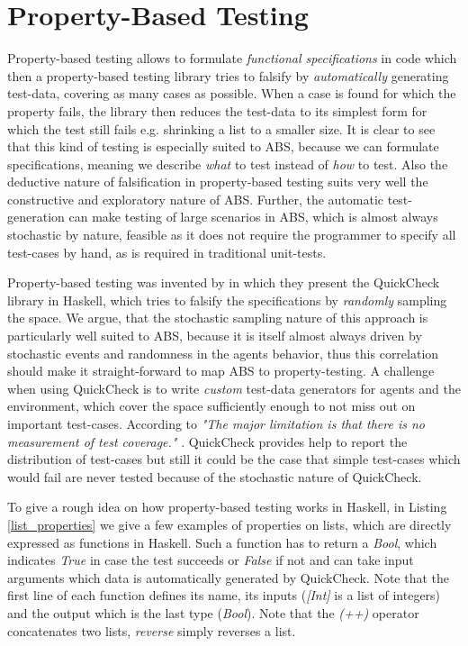 \section{Property-Based Testing}
\label{sec:proptesting}

Property-based testing allows to formulate \textit{functional specifications} in code which then a property-based testing library tries to falsify by \textit{automatically} generating test-data, covering as many cases as possible. When a case is found for which the property fails, the library then reduces the test-data to its simplest form for which the test still fails e.g. shrinking a list to a smaller size. It is clear to see that this kind of testing is especially suited to ABS, because we can formulate specifications, meaning we describe \textit{what} to test instead of \textit{how} to test. Also the deductive nature of falsification in property-based testing suits very well the constructive and exploratory nature of ABS. Further, the automatic test-generation can make testing of large scenarios in ABS, which is almost always stochastic by nature, feasible as it does not require the programmer to specify all test-cases by hand, as is required in traditional unit-tests.

Property-based testing was invented by  in which they present the QuickCheck library in Haskell, which tries to falsify the specifications by \textit{randomly} sampling the space. We argue, that the stochastic sampling nature of this approach is particularly well suited to ABS, because it is itself almost always driven by stochastic events and randomness in the agents behavior, thus this correlation should make it straight-forward to map ABS to property-testing. A challenge when using QuickCheck is to write \textit{custom} test-data generators for agents and the environment, which cover the space sufficiently enough to not miss out on important test-cases. According to  \textit{"The major limitation is that there is no measurement of test coverage."} . QuickCheck provides help to report the distribution of test-cases but still it could be the case that simple test-cases which would fail are never tested because of the stochastic nature of QuickCheck.

To give a rough idea on how property-based testing works in Haskell, in Listing \ref{list_properties} we give a few examples of properties on lists, which are directly expressed as functions in Haskell. Such a function has to return a \textit{Bool}, which indicates \textit{True} in case the test succeeds or \textit{False} if not and can take input arguments which data is automatically generated by QuickCheck. Note that the first line of each function defines its name, its inputs (\textit{[Int]} is a list of integers) and the output which is the last type (\textit{Bool}). Note that the \textit{(++)} operator concatenates two lists, \textit{reverse} simply reverses a list.

